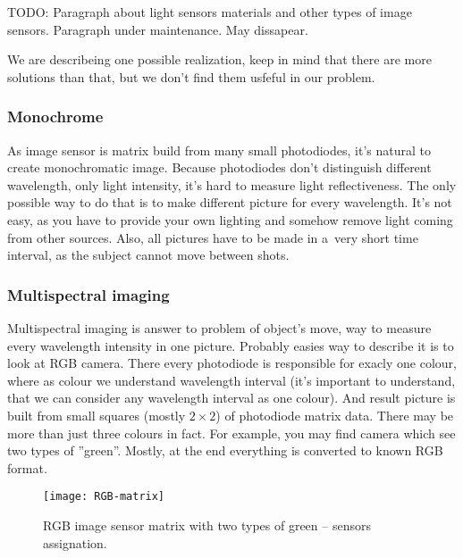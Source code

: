         TODO: Paragraph about light sensors materials and other types of image sensors.
        Paragraph under maintenance. May dissapear.

        We are describeing one possible realization, keep in mind that
        there are more solutions than that, but we don't find them usfeful in our problem.

        \subsubsection*{Monochrome}
            As image sensor is matrix build from many small photodiodes,
            it's natural to create monochromatic image.
            Because photodiodes don't distinguish different
            wavelength, only light intensity, it's hard
            to measure light reflectiveness.
            The only possible way to do that is to
            make different picture for every wavelength.
            It's not easy, as you have to
            provide your own lighting and somehow remove
            light coming from other sources.
            Also, all pictures have to be made in
            a~very short time interval, as the subject
            cannot move between shots.

        \subsubsection*{Multispectral imaging}
            Multispectral imaging is answer to
            problem of object's move,
            way to measure every wavelength intensity in one picture.
            Probably easies way to describe it is to look at RGB camera.
            There every photodiode is responsible for exacly one colour,
            where as colour we understand wavelength interval (it's important
            to understand, that we can consider any wavelength interval as one colour).
            And result picture is built from small squares (mostly $2 \times 2$)
            of photodiode matrix data.
            There may be more than just  three colours in fact.
            For example, you may find camera which see two types of ''green''.
            Mostly, at the end everything is converted to known RGB format.

            \begin{figure}[H]
                \caption{RGB image sensor matrix with two types of green -- sensors assignation.}
                \centering
                \texttt{[image: RGB-matrix]}
                \label{fig:RGB-matrix}
            \end{figure}

